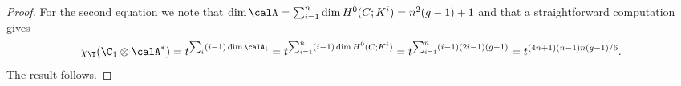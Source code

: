 \begin{proof}
	For the second equation we note that $\dim \calA=\sum_{i=1}^n\dim H^0(C;K^i)= n^2(g-1)+1$ and that a straightforward computation  gives $$\chi_\T(\C_1\otimes \calA^*)=t^{\sum_i (i-1)\dim \calA_i}=t^{\sum_{i=1}^n (i-1)\dim H^0(C;K^i)}=t^{\sum_{i=1}^n (i-1)(2i-1)(g-1)}=t^{(4n+1)(n-1)n(g-1)/6} .$$ The result follows.













\end{proof}
